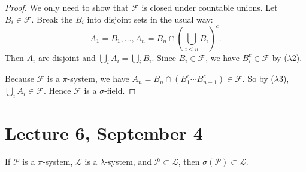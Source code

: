 \documentclass[11pt,fleqn]{book} %
\begin{document}
\begin{proof}
	We only need to show that $\mathcal{F}$ is closed under countable unions. Let $B_i \in \mathcal{F}$. Break the $B_i$ into disjoint sets in the usual way:
	\[
		A_1 = B_1, \dots, A_n = B_n \cap \left( \bigcup_{i<n} B_i \right)^c.
	\]
	Then $A_i$ are disjoint and $\bigcup_i A_i = \bigcup_i B_i$. Since $B_i \in \mathcal{F}$, we have $B_i^c \in \mathcal{F}$ by ($\lambda$2).

	Because $\mathcal{F}$ is a $\pi$-system, we have $A_n = B_n \cap (B_1^c \cdots B_{n-1}^c) \in \mathcal{F}$. So by ($\lambda$3), $\bigcup_i A_i \in \mathcal{F}$. Hence $\mathcal{F}$ is a $\sigma$-field.
\end{proof}

\section{Lecture 6, September 4}

\begin{theorem} \label{thm:dynkin}
	If $\mathcal{P}$ is a $\pi$-system, $\mathcal{L}$ is a $\lambda$-system, and $\mathcal{P} \subset \mathcal{L}$, then $\sigma(\mathcal{P}) \subset \mathcal{L}$.
\end{theorem}
\end{document}
